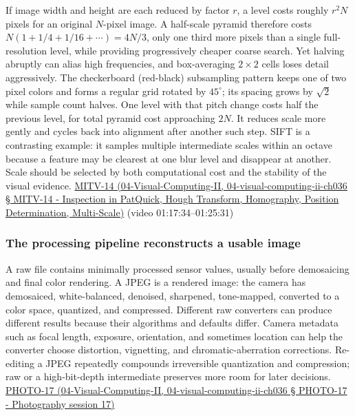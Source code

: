 If image width and height are each reduced by factor \(r\), a level costs roughly \(r^2N\) pixels for an original \(N\)-pixel image. A half-scale pyramid therefore costs \(N(1+1/4+1/16+\cdots)=4N/3\), only one third more pixels than a single full-resolution level, while providing progressively cheaper coarse search. Yet halving abruptly can alias high frequencies, and box-averaging \(2\times2\) cells loses detail aggressively. The checkerboard (red-black) subsampling pattern keeps one of two pixel colors and forms a regular grid rotated by \(45^\circ\); its spacing grows by \(\sqrt2\) while sample count halves. One level with that pitch change costs half the previous level, for total pyramid cost approaching \(2N\). It reduces scale more gently and cycles back into alignment after another such step. SIFT is a contrasting example: it samples multiple intermediate scales within an octave because a feature may be clearest at one blur level and disappear at another. Scale should be selected by both computational cost and the stability of the visual evidence. \href{}{MITV-14 (04-Visual-Computing-II, 04-visual-computing-ii-ch036 § MITV-14 - Inspection in PatQuick, Hough Transform, Homography, Position Determination, Multi-Scale)} (video 01:17:34--01:25:31)

\subsubsection{The processing pipeline reconstructs a usable image}\label{the-processing-pipeline-reconstructs-a-usable-image}

A raw file contains minimally processed sensor values, usually before demosaicing and final color rendering. A JPEG is a rendered image: the camera has demosaiced, white-balanced, denoised, sharpened, tone-mapped, converted to a color space, quantized, and compressed. Different raw converters can produce different results because their algorithms and defaults differ. Camera metadata such as focal length, exposure, orientation, and sometimes location can help the converter choose distortion, vignetting, and chromatic-aberration corrections. Re-editing a JPEG repeatedly compounds irreversible quantization and compression; raw or a high-bit-depth intermediate preserves more room for later decisions. \href{}{PHOTO-17 (04-Visual-Computing-II, 04-visual-computing-ii-ch036 § PHOTO-17 - Photography session 17)}

